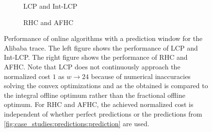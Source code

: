 \begin{figure}
    \begin{subfigure}[b]{.5175\linewidth}
    \resizebox{\textwidth}{!}{}
    \caption{LCP and Int-LCP}\label{fig:case_studies:predictions:lcp}
    \end{subfigure}
    \begin{subfigure}[b]{.4825\linewidth}
    \resizebox{\textwidth}{!}{}
    \caption{RHC and AFHC}\label{fig:case_studies:predictions:mpc}
    \end{subfigure}
    \caption{Performance of online algorithms with a prediction window for the Alibaba trace. The left figure shows the performance of LCP and Int-LCP. The right figure shows the performance of RHC and AFHC. Note that LCP does not continuously approach the normalized cost $1$ as $w \to 24$ because of numerical inaccuracies solving the convex optimizations and as the obtained is compared to the integral offline optimum rather than the fractional offline optimum. For RHC and AFHC, the achieved normalized cost is independent of whether perfect predictions or the predictions from \cref{fig:case_studies:predictions:prediction} are used.}
\end{figure}
